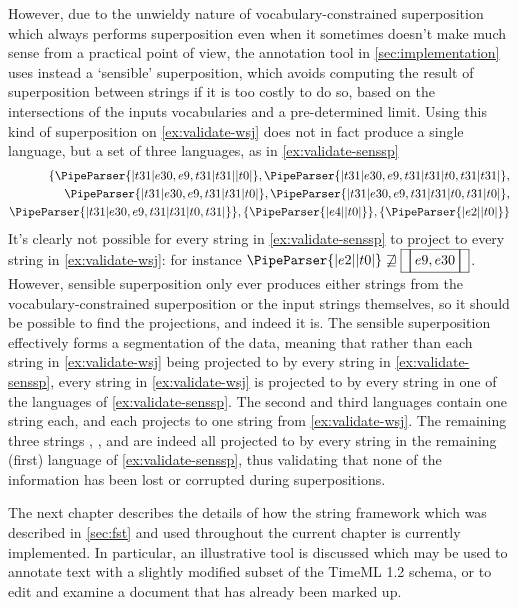 \documentclass[a4paper,12pt,leqno,twoside]{article}
\newcommand{\vph}[1]{\vphantom{#1}}
\newcommand{\ebox}[1]{\fbox{$\vph{'(),}#1$}}
\newcommand{\nbBefore}[2]{\ebox{#1}\ebox{}\ebox{#2}}
\newcommand{\nbDuring}[2]{\ebox{#2}\ebox{#1,#2}\ebox{#2}}
\newcommand{\nbEquals}[2]{\ebox{#1,#2}}
\newcommand{\Before}[2]{\ebox{}\nbBefore{#1}{#2}\ebox{}}
\newcommand{\During}[2]{\ebox{}\nbDuring{#1}{#2}\ebox{}}
\newcommand{\Equals}[2]{\ebox{}\nbEquals{#1}{#2}\ebox{}}
\newcommand{\EventString}[1]{%
	\renewcommand*{\do}[1]{\ebox{##1}}%
	\PipeParser{#1}%
}
\begin{document}
However, due to the unwieldy nature of vocabulary-constrained superposition which always performs superposition even when it sometimes doesn't make much sense from a practical point of view, the annotation tool in \cref{sec:implementation} uses instead a `sensible' superposition, which avoids computing the result of superposition between strings if it is too costly to do so, based on the intersections of the inputs vocabularies and a pre-determined limit. Using this kind of superposition on \cref{ex:validate-wsj} does not in fact produce a single language, but a set of three languages, as in \cref{ex:validate-senssp}
\begin{align}
	\{\EventString{{}|t31|e30,e9,t31|t31|{}|t0|{}}, \EventString{{}|t31|e30,e9,t31|t31|t0,t31|t31|{}},\label{ex:validate-senssp}\\
	\EventString{{}|t31|e30,e9,t31|t31|t0|{}}, \EventString{{}|t31|e30,e9,t31|t31|t0,t31|t0|{}},\notag\\
	\EventString{{}|t31|e30,e9,t31|t31|t0,t31|{}}\}, \{\EventString{{}|e4|{}|t0|{}}\}, \{\EventString{{}|e2|{}|t0|{}}\}\notag
\end{align}
It's clearly not possible for every string in \cref{ex:validate-senssp} to project to every string in \cref{ex:validate-wsj}: for instance $\EventString{{}|e2|{}|t0|{}} \not\sqsupseteq \Equals{e9}{e30}$. However, sensible superposition only ever produces either strings from the vocabulary-constrained superposition or the input strings themselves, so it should be possible to find the projections, and indeed it is. The sensible superposition effectively forms a segmentation of the data, meaning that rather than each string in \cref{ex:validate-wsj} being projected to by every string in \cref{ex:validate-senssp}, every string in \cref{ex:validate-wsj} is projected to by every string in one of the languages of \cref{ex:validate-senssp}. The second and third languages contain one string each, and each projects to one string from \cref{ex:validate-wsj}. The remaining three strings \Equals{e9}{e30}, \Before{e9}{t0}, and \During{e30}{t31} are indeed all projected to by every string in the remaining (first) language of \cref{ex:validate-senssp}, thus validating that none of the information has been lost or corrupted during superpositions.

The next chapter describes the details of how the string framework which was described in \cref{sec:fst} and used throughout the current chapter is currently implemented. In particular, an illustrative tool is discussed which may be used to annotate text with a slightly modified subset of the TimeML 1.2 \citep{timeml2005timeml} schema, or to edit and examine a document that has already been marked up.
\end{document}
